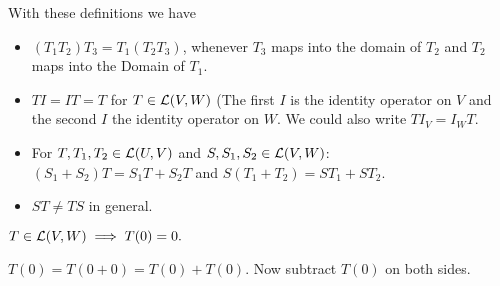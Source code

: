 \begin{thm} 
  With these definitions we have
  \begin{itemize}
    \item {} $(T_1 T_2) T_3 = T_1 (T_2 T_3)$, whenever $T_3$ maps into the domain of $T_2$ and $T_2$ maps into the Domain of $T_1$.
    \item {} $T I = I T = T$ for $T \in {\mathcal{L}(V,W)}$ (The first $I$ is the identity operator on $V$ and the second $I$ the identity operator on $W$.
    We could also write $T I_V = I_W T$.
    \item {} For $T, T_1, T_2 \in {\mathcal{L}(U, V)}$ and $S, S_1, S_2 \in {\mathcal{L}(V, W)}$: \\ $(S_1 + S_2)T=S_1 T + S_2 T$ and $S(T_1 + T_2)=S T_1 + S T_2$.
    \item {} $ST \neq TS$ in general.
  \end{itemize}
\end{thm}

\setcounter{thm}{9}
\begin{thm} 
  \label{thm: linear maps take 0 to 0}
  $T\in {\mathcal{L}(V,W)} \implies T(0)=0.$
\end{thm}
\begin{prf}
  $T(0) = T(0+0) = T(0) + T(0)$. Now subtract $T(0)$ on both sides.
\end{prf}